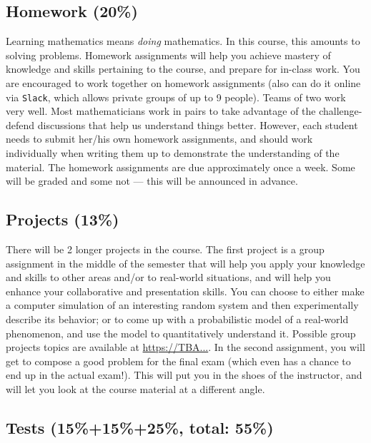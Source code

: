 \documentclass[oneside,11pt]{amsart}
\begin{document}
\subsection{Homework (20\%)}


Learning mathematics means \emph{doing} mathematics. 
In this course, this amounts to solving problems.
Homework assignments 
will help you achieve mastery of knowledge and skills pertaining to the course,
and prepare for in-class work.
You are encouraged to work together on homework assignments (also can do it online via
\texttt{Slack}, which allows private groups of up to 9 people).
Teams of two work very well. Most mathematicians work in pairs to take advantage of the challenge-defend discussions that help us understand things better.
However, each student needs to submit her/his own homework assignments,
and should work individually when writing them up to demonstrate
the understanding of the material.
The homework assignments are due approximately once a week. Some will be graded and some not ---
this will be announced in advance.

\subsection{Projects (13\%)}

There will be 2 longer projects in the course. 
The first project is a group assignment in the middle of the semester
that will help you apply your knowledge and skills
to other areas and/or to real-world situations,
and will help you enhance your collaborative and presentation skills.
You can choose to either make a computer simulation of an interesting random 
system and then experimentally describe its behavior;
or to come up with a probabilistic model of a real-world phenomenon, and 
use the model to quantitatively understand it.
Possible group projects topics are available at \url{https://TBA...}.
In the second assignment, you will get to compose a good problem for the final
exam (which even has a chance to end up in the actual exam!).
This will put you in the shoes of the instructor, and will 
let you look at the course material at a different angle.

\subsection{Tests (15\%+15\%+25\%, total: 55\%)}
\end{document}
